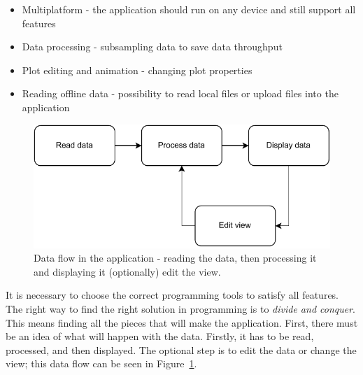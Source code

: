 \begin{itemize}
    \item Multiplatform - the application should run on any device and still support all features
    \item Data processing - subsampling data to save data throughput
    \item Plot editing and animation - changing plot properties
    \item Reading offline data - possibility to read local files or upload files into the application
\end{itemize}


\begin{figure}[h]
    \centering
    \includegraphics{pdf/simple_application.drawio.pdf}
    \caption{Data flow in the application - reading the data, then processing it and displaying it (optionally) edit the view.}
    \label{fig:dataflow}
\end{figure}

It is necessary to choose the correct programming tools to satisfy all features. The right way to find the right solution in programming is to \textit{divide and conquer}. This means finding all the pieces that will make the application. First, there must be an idea of what will happen with the data. Firstly, it has to be read, processed, and then displayed. The optional step is to edit the data or change the view; this data flow can be seen in Figure~\ref{fig:dataflow}. 



